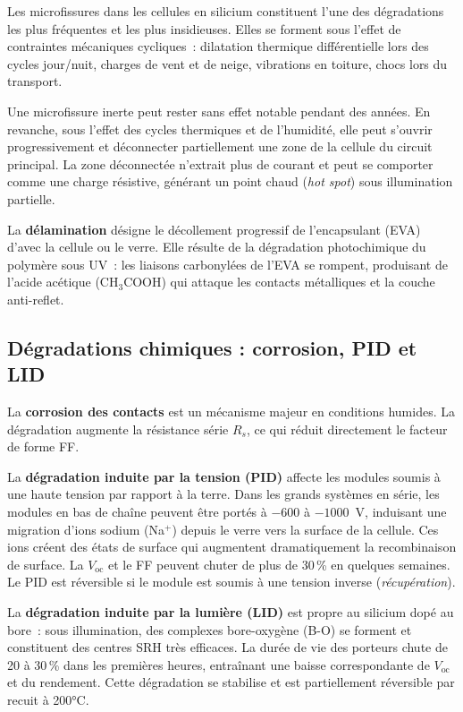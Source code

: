 \documentclass[12pt,a4paper]{report}
\begin{document}
Les microfissures dans les cellules en silicium constituent l'une des dégradations les plus fréquentes et les plus insidieuses. Elles se forment sous l'effet de contraintes mécaniques cycliques~: dilatation thermique différentielle lors des cycles jour/nuit, charges de vent et de neige, vibrations en toiture, chocs lors du transport.

Une microfissure inerte peut rester sans effet notable pendant des années. En revanche, sous l'effet des cycles thermiques et de l'humidité, elle peut s'ouvrir progressivement et déconnecter partiellement une zone de la cellule du circuit principal. La zone déconnectée n'extrait plus de courant et peut se comporter comme une charge résistive, générant un point chaud (\textit{hot spot}) sous illumination partielle.

La \textbf{délamination} désigne le décollement progressif de l'encapsulant (EVA) d'avec la cellule ou le verre. Elle résulte de la dégradation photochimique du polymère sous UV~: les liaisons carbonylées de l'EVA se rompent, produisant de l'acide acétique (CH$_3$COOH) qui attaque les contacts métalliques et la couche anti-reflet.

\subsection{Dégradations chimiques : corrosion, PID et LID}

La \textbf{corrosion des contacts} est un mécanisme majeur en conditions humides. La dégradation augmente la résistance série $R_s$, ce qui réduit directement le facteur de forme FF.

La \textbf{dégradation induite par la tension (PID)} affecte les modules soumis à une haute tension par rapport à la terre. Dans les grands systèmes en série, les modules en bas de chaîne peuvent être portés à $-600$ à $-1000$~V, induisant une migration d'ions sodium (Na$^+$) depuis le verre vers la surface de la cellule. Ces ions créent des états de surface qui augmentent dramatiquement la recombinaison de surface. La $V_\text{oc}$ et le FF peuvent chuter de plus de 30\,\% en quelques semaines. Le PID est réversible si le module est soumis à une tension inverse (\textit{récupération}).

La \textbf{dégradation induite par la lumière (LID)} est propre au silicium dopé au bore~: sous illumination, des complexes bore-oxygène (B-O) se forment et constituent des centres SRH très efficaces. La durée de vie des porteurs chute de 20 à 30\,\% dans les premières heures, entraînant une baisse correspondante de $V_\text{oc}$ et du rendement. Cette dégradation se stabilise et est partiellement réversible par recuit à 200°C.
\end{document}
